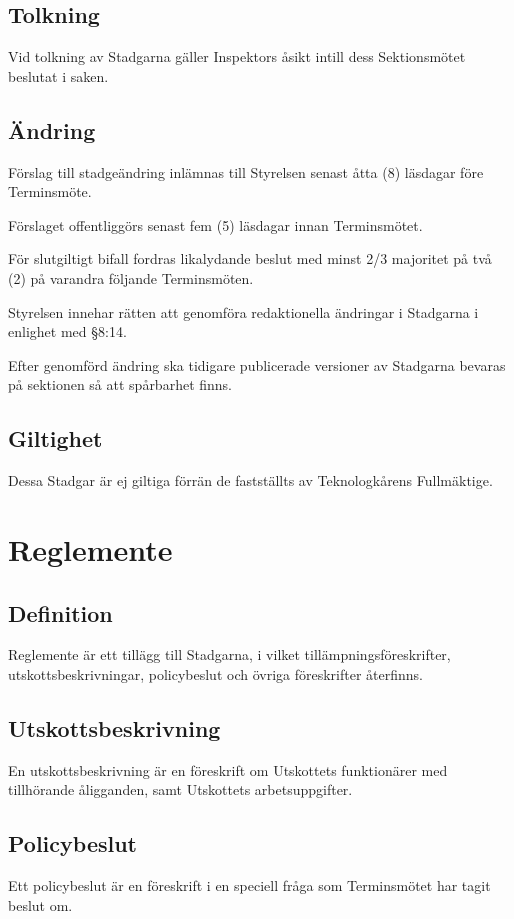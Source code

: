 \documentclass[10pt]{article}
\begin{document}
    \subsection{Tolkning}
    Vid tolkning av Stadgarna gäller Inspektors åsikt intill dess Sektionsmötet
    beslutat i saken.
    
    \subsection{Ändring}
    Förslag till stadgeändring inlämnas till Styrelsen senast åtta (8) läsdagar
    före Terminsmöte.
    
    Förslaget offentliggörs senast fem (5) läsdagar innan Terminsmötet.
    
    För slutgiltigt bifall fordras likalydande beslut med minst 2/3 majoritet på
    två (2) på varandra följande Terminsmöten.

    Styrelsen innehar rätten att genomföra redaktionella ändringar i Stadgarna i enlighet med §8:14.
    
    Efter genomförd ändring ska tidigare publicerade versioner av Stadgarna bevaras på sektionen så att spårbarhet finns.
    
    \subsection{Giltighet}
    Dessa Stadgar är ej giltiga förrän de fastställts av Teknologkårens
    Fullmäktige.
    \newpage
    
    \section{Reglemente}
    \subsection{Definition}
    Reglemente är ett tillägg till Stadgarna, i vilket tillämpningsföreskrifter,
    utskottsbeskrivningar, policybeslut och övriga föreskrifter återfinns.
    
    \subsection{Utskottsbeskrivning}
    En utskottsbeskrivning är en föreskrift om Utskottets funktionärer med
    tillhörande åligganden, samt Utskottets arbetsuppgifter.
    
    \subsection{Policybeslut}
    Ett policybeslut är en föreskrift i en speciell fråga som Terminsmötet har
    tagit beslut om.
    
\end{document}
